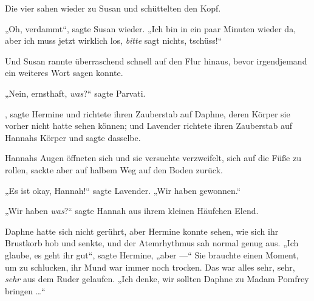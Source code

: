 Die vier sahen wieder zu Susan und schüttelten den Kopf.

„Oh, verdammt“, sagte Susan wieder.
„Ich bin in ein paar Minuten wieder da, aber ich muss jetzt wirklich los, \emph{bitte} sagt nichts, tschüss!“

Und Susan rannte überraschend schnell auf den Flur hinaus, bevor irgendjemand ein weiteres Wort sagen konnte.

„Nein, ernsthaft, \emph{was}?“ sagte Parvati.

, sagte Hermine und richtete ihren Zauberstab auf Daphne, deren Körper sie vorher nicht hatte sehen können; und Lavender richtete ihren Zauberstab auf Hannahs Körper und sagte dasselbe.

Hannahs Augen öffneten sich und sie versuchte verzweifelt, sich auf die Füße zu rollen, sackte aber auf halbem Weg auf den Boden zurück.

„Es ist okay, Hannah!“ sagte Lavender.
„Wir haben gewonnen.“

„Wir haben \emph{was}?“ sagte Hannah aus ihrem kleinen Häufchen Elend.

Daphne hatte sich nicht gerührt, aber Hermine konnte sehen, wie sich ihr Brustkorb hob und senkte, und der Atemrhythmus sah normal genug aus.
„Ich glaube, es geht ihr gut“, sagte Hermine, „aber —“ Sie brauchte einen Moment, um zu schlucken, ihr Mund war immer noch trocken. Das war alles sehr, sehr, \emph{sehr} aus dem Ruder gelaufen.
„Ich denke, wir sollten Daphne zu Madam Pomfrey bringen …“

